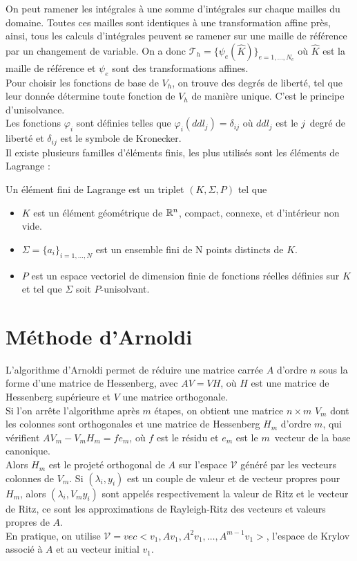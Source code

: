 On peut ramener les intégrales à une somme d'intégrales sur chaque mailles du domaine. Toutes ces mailles sont identiques à une transformation affine près, ainsi, tous les calculs d'intégrales peuvent se ramener sur une maille de référence par un changement de variable. On a donc $\mathcal{T}_h=\{\psi_e(\hat{K})\}_{e=1,\dots,N_e}$ où $\hat{K}$ est la maille de référence et $\psi_e$ sont des transformations affines.\\

Pour choisir les fonctions de base de $V_h$, on trouve des degrés de liberté, tel que leur donnée détermine toute fonction de $V_h$ de manière unique. C'est le principe d'unisolvance.\\
Les fonctions $\varphi_i$ sont  définies telles que $\varphi_i(ddl_j)=\delta_{ij}$ où $ddl_j$ est le $j$\ieme\ degré de liberté et $\delta_{ij}$ est le symbole de Kronecker.\\
Il existe plusieurs familles d'éléments finis, les plus utilisés sont les éléments de Lagrange :
\begin{mydef} Un élément fini de Lagrange est un triplet $(K,\Sigma,P)$ tel que
\begin{itemize}
\item $K$ est un élément géométrique de ${\mathbb{R}}^n$, compact, connexe, et d'intérieur non vide.
\item $\Sigma = \{a_i\}_{i=1,\dots,N}$ est un ensemble fini de N points distincts de $K$.
\item $P$ est un espace vectoriel de dimension finie de fonctions réelles définies sur $K$ et tel que $\Sigma$ soit $P$-unisolvant.
\end{itemize}
\end{mydef}


\section{Méthode d'Arnoldi}
\label{arnoldi}
L'algorithme d'Arnoldi permet de réduire une matrice carrée $A$ d'ordre $n$ sous la forme d'une matrice de Hessenberg, avec $AV = VH$, où $H$ est une matrice de Hessenberg supérieure et $V$ une matrice orthogonale.\\
Si l'on arrête l'algorithme après $m$ étapes, on obtient une matrice $n\times m$ $V_m$ dont les colonnes sont orthogonales et une matrice de Hessenberg $H_m$ d'ordre $m$, qui vérifient $AV_m - V_mH_m = fe_m$, où $f$ est le résidu et $e_m$ est le $m$\ieme\ vecteur de la base canonique.\\
Alors $H_m$ est le projeté orthogonal de $A$ sur l'espace $\mathcal{V}$ généré par les vecteurs colonnes de $V_m$. Si $(\lambda_i, y_i)$ est un couple de valeur et de vecteur propres pour $H_m$, alors $(\lambda_i, V_my_i)$ sont appelés respectivement la valeur de Ritz et le vecteur de Ritz, ce sont les approximations de Rayleigh-Ritz des vecteurs et valeurs propres de $A$.\\
En pratique, on utilise $\mathcal{V}= vec<v_1, Av_1, A^2v_1,\dots,A^{m-1}v_1>$, l'espace de Krylov associé à $A$ et au vecteur initial $v_1$.\\

